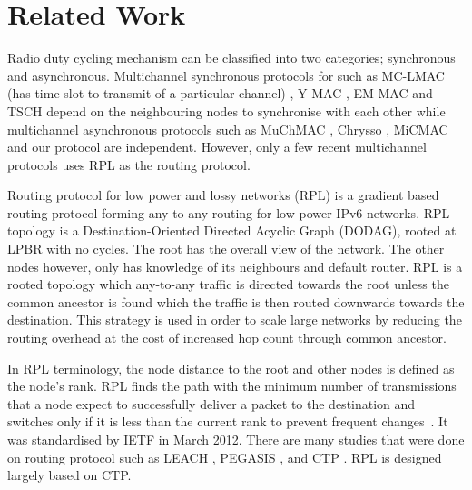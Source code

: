 \section{Related Work}

Radio duty cycling mechanism can be classified into two categories; synchronous and asynchronous. Multichannel synchronous protocols for such as MC-LMAC (has time slot to transmit of a particular channel) \cite{mc-lmac}, Y-MAC \cite{y-mac}, EM-MAC \cite{emmac} and TSCH depend on the neighbouring nodes to synchronise with each other while multichannel asynchronous protocols such as MuChMAC \cite{muchmac}, Chrysso \cite{chrysso}, MiCMAC \cite{micmac} and our protocol are independent. However, only a few recent multichannel protocols uses RPL as the routing protocol. 

Routing protocol for low power and lossy networks (RPL) is a gradient based routing protocol forming any-to-any routing for low power IPv6 networks. RPL topology is a Destination-Oriented Directed Acyclic Graph (DODAG), rooted at LPBR with no cycles. The root has the overall view of the network. The other nodes however, only has knowledge of its neighbours and default router. RPL is a rooted topology which any-to-any traffic is directed towards the root unless the common ancestor is found which the traffic is then routed downwards towards the destination. This strategy is used in order to scale large networks by reducing the routing overhead at the cost of increased hop count through common ancestor. %

In RPL terminology, the node distance to the root and other nodes is defined as the node's rank. RPL finds the path with the minimum number of transmissions that a node expect to successfully deliver a packet to the destination and switches only if it is less than the current rank to prevent frequent changes~\cite{mrhof}. It was standardised by IETF in March 2012. There are many studies that were done on routing protocol such as LEACH \cite{leach}, PEGASIS \cite{pegasis}, and CTP \cite{ctp}. RPL is designed largely based on CTP.

